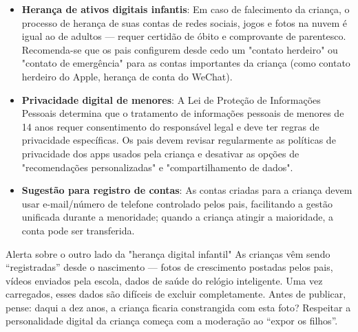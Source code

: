 \begin{itemize}
  \item \textbf{Herança de ativos digitais infantis}: Em caso de falecimento da criança, o processo de herança de suas contas de redes sociais, jogos e fotos na nuvem é igual ao de adultos — requer certidão de óbito e comprovante de parentesco. Recomenda-se que os pais configurem desde cedo um "contato herdeiro" ou "contato de emergência" para as contas importantes da criança (como contato herdeiro do Apple, herança de conta do WeChat).
  \item \textbf{Privacidade digital de menores}: A Lei de Proteção de Informações Pessoais determina que o tratamento de informações pessoais de menores de 14 anos requer consentimento do responsável legal e deve ter regras de privacidade específicas. Os pais devem revisar regularmente as políticas de privacidade dos apps usados pela criança e desativar as opções de "recomendações personalizadas" e "compartilhamento de dados".
  \item \textbf{Sugestão para registro de contas}: As contas criadas para a criança devem usar e-mail/número de telefone controlado pelos pais, facilitando a gestão unificada durante a menoridade; quando a criança atingir a maioridade, a conta pode ser transferida.
\end{itemize}

\begin{tcbwarn}{Alerta sobre o outro lado da "herança digital infantil"}
As crianças vêm sendo “registradas” desde o nascimento — fotos de crescimento postadas pelos pais, vídeos enviados pela escola, dados de saúde do relógio inteligente. Uma vez carregados, esses dados são difíceis de excluir completamente. Antes de publicar, pense: daqui a dez anos, a criança ficaria constrangida com esta foto? Respeitar a personalidade digital da criança começa com a moderação ao “expor os filhos”.

\end{tcbwarn}

